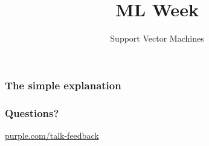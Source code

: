 
\title
{ML Week}
\subtitle{Support Vector Machines}




\begin{frame}
  \titlepage
\end{frame}

\begin{frame}
  \frametitle{The simple explanation}
\end{frame}

\begin{frame}
\end{frame}


\begin{frame}
  \frametitle{Questions?}
  \centerline{\large\url{purple.com/talk-feedback}}
\end{frame}


